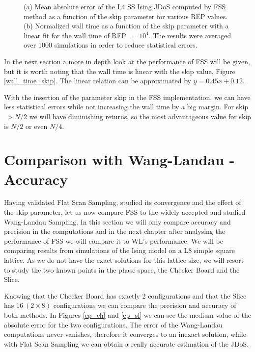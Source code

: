 	\pagebreak

\begin{figure}[h]
	\centering
	\caption{(a) Mean absolute error of the L4 SS Ising JDoS computed by FSS method as a function of the skip parameter for various REP values. (b) Normalized wall time as a function of the skip parameter with a linear fit for the wall time of REP $=\ 10^4$. The results were averaged over 1000 simulations in order to reduce statistical errors.}
\end{figure}

	In the next section a more in depth look at the performance of FSS will be given, but it is worth noting that the wall time is linear with the skip value, Figure \ref{wall_time_skip}. The linear relation can be approximated by $y=0.45x + 0.12$. 
	
	With the insertion of the parameter skip in the FSS implementation, we can have less statistical errors while not increasing the wall time by a big margin. For skip$\ > N/2$ we will have diminishing returns, so the most advantageous value for skip is $N/2$ or even $N/4$. 

\section{Comparison with Wang-Landau - Accuracy}

	Having validated Flat Scan Sampling, studied its convergence and the effect of the skip parameter, let us now compare FSS to the widely accepted and studied Wang-Landau Sampling. In this section we will only compare accuracy and precision in the computations and in the next chapter after analysing the performance of FSS we will compare it to WL's performance. 
	We will be comparing results from simulations of the Ising model on a L8 simple square lattice. As we do not have the exact solutions for this lattice size, we will resort to study the two known points in the phase space, the Checker Board and the Slice. 
	
	Knowing that the Checker Board has exactly 2 configurations and that the Slice has $16\ (2 \times 8)$ configurations we can compare the precision and accuracy of both methods. In Figures \ref{ep_ch} and \ref{ep_sl} we can see the medium value of the absolute error for the two configurations. The error of the Wang-Landau computations never vanishes, therefore it converges to an inexact solution, while with Flat Scan Sampling we can obtain a really accurate estimation of the JDoS. 
	
